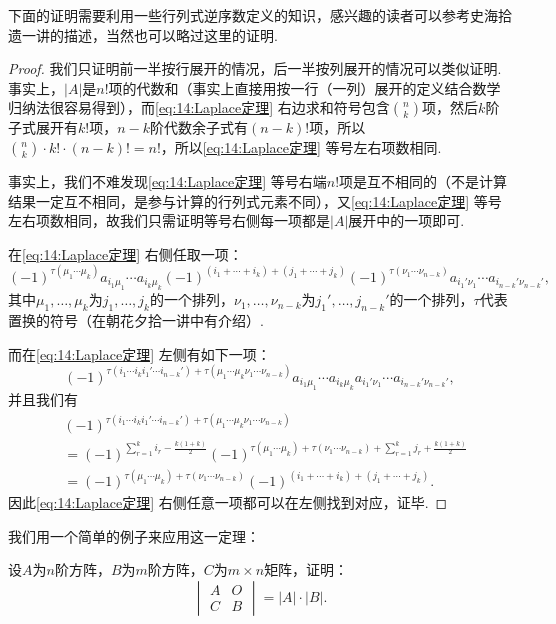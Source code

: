 下面的证明需要利用一些行列式逆序数定义的知识，感兴趣的读者可以参考史海拾遗一讲的描述，当然也可以略过这里的证明.

\begin{proof}
    我们只证明前一半按行展开的情况，后一半按列展开的情况可以类似证明. 事实上，$|A|$是$n!$项的代数和（事实上直接用按一行（一列）展开的定义结合数学归纳法很容易得到），而\autoref{eq:14:Laplace定理} 右边求和符号包含$\binom{n}{k}$项，然后$k$阶子式展开有$k!$项，$n-k$阶代数余子式有$(n-k)!$项，所以$\binom{n}{k}\cdot k!\cdot (n-k)!=n!$，所以\autoref{eq:14:Laplace定理} 等号左右项数相同.

    事实上，我们不难发现\autoref{eq:14:Laplace定理} 等号右端$n!$项是互不相同的（不是计算结果一定互不相同，是参与计算的行列式元素不同），又\autoref{eq:14:Laplace定理} 等号左右项数相同，故我们只需证明等号右侧每一项都是$|A|$展开中的一项即可.

    在\autoref{eq:14:Laplace定理} 右侧任取一项：
    \[(-1)^{\tau(\mu_1\cdots\mu_k)}a_{i_1\mu_1}\cdots a_{i_k\mu_k}(-1)^{(i_1+\cdots+i_k)+(j_1+\cdots+j_k)}(-1)^{\tau(\nu_1\cdots\nu_{n-k})}a_{i_1'\nu_1}\cdots a_{i_{n-k}'\nu_{n-k}'},\]
    其中$\mu_1,\ldots,\mu_k$为$j_1,\ldots,j_k$的一个排列，$\nu_1,\ldots,\nu_{n-k}$为$j_1',\ldots,j_{n-k}'$的一个排列，$\tau$代表置换的符号（在朝花夕拾一讲中有介绍）.

    而在\autoref{eq:14:Laplace定理} 左侧有如下一项：
    \[(-1)^{\tau(i_1\cdots i_ki_1'\cdots i_{n-k}')+\tau(\mu_1\cdots\mu_k\nu_1\cdots\nu_{n-k})}a_{i_1\mu_1}\cdots a_{i_k\mu_k}a_{i_1'\nu_1}\cdots a_{i_{n-k}'\nu_{n-k}'},\]
    并且我们有
    \begin{align*}
         & (-1)^{\tau(i_1\cdots i_ki_1'\cdots i_{n-k}')+\tau(\mu_1\cdots\mu_k\nu_1\cdots\nu_{n-k})}                                                        \\
         & =(-1)^{\sum\limits_{r=1}^ki_r-\frac{k(1+k)}{2}}(-1)^{\tau(\mu_1\cdots\mu_k)+\tau(\nu_1\cdots\nu_{n-k})+\sum\limits_{r=1}^kj_r+\frac{k(1+k)}{2}} \\
         & =(-1)^{\tau(\mu_1\cdots\mu_k)+\tau(\nu_1\cdots\nu_{n-k})}(-1)^{(i_1+\cdots+i_k)+(j_1+\cdots+j_k)}.
    \end{align*}
    因此\autoref{eq:14:Laplace定理} 右侧任意一项都可以在左侧找到对应，证毕.
\end{proof}

我们用一个简单的例子来应用这一定理：
\begin{example}{}{}
    设$A$为$n$阶方阵，$B$为$m$阶方阵，$C$为$m\times n$矩阵，证明：
    \[ \begin{vmatrix}
            A & O \\
            C & B
        \end{vmatrix}=|A|\cdot|B|. \]
\end{example}

